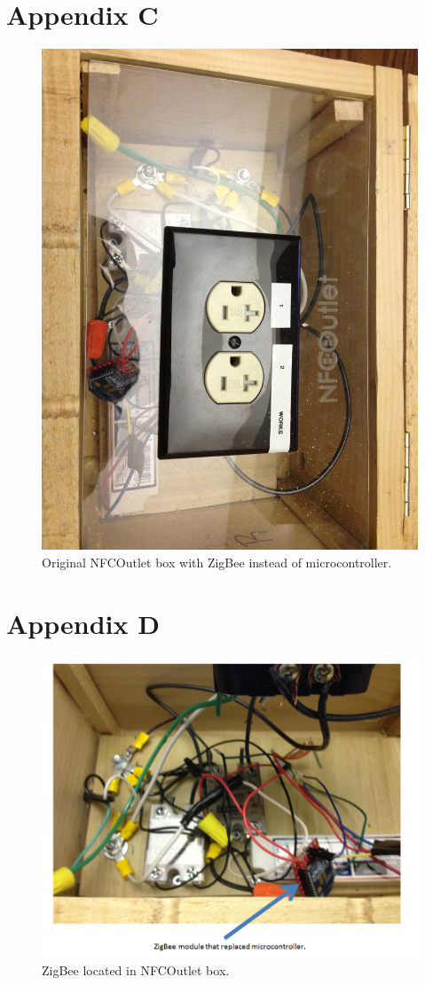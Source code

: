\documentclass{sigchi}
\begin{document}
\section{Appendix C}

\begin{figure}[!h]
\centering
\includegraphics[width=0.9\columnwidth]{app_c}
\caption{Original NFCOutlet box with ZigBee instead of microcontroller.}
\label{fig:app_c}
\end{figure}

\section{Appendix D}

\begin{figure}[!h]
\centering
\includegraphics[width=0.9\columnwidth]{zig}
\caption{ZigBee located in NFCOutlet box.}
\label{fig:zig}
\end{figure}


%
%
\end{document}
